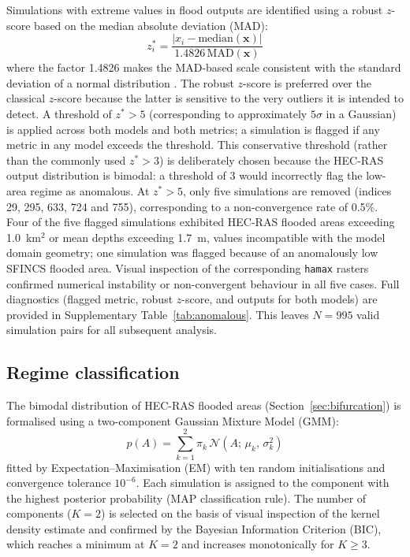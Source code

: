\documentclass[review,12pt]{elsarticle}
\newcommand{\hecras}{\textsc{HEC-RAS}}
\begin{document}
Simulations with extreme values in flood outputs are identified using a
robust $z$-score based on the median absolute deviation (MAD):
\begin{equation}
  z_i^* = \frac{|x_i - \mathrm{median}(\mathbf{x})|}{1.4826\,\mathrm{MAD}(\mathbf{x})}
  \label{eq:robust_z}
\end{equation}
where the factor 1.4826 makes the MAD-based scale consistent with the
standard deviation of a normal distribution \citep{rousseeuw1993}.
The robust $z$-score is preferred over the classical $z$-score because the
latter is sensitive to the very outliers it is intended to detect.
A threshold of $z^* > 5$ (corresponding to approximately $5\sigma$ in a
Gaussian) is applied across both models and both metrics; a simulation is
flagged if any metric in any model exceeds the threshold.
This conservative threshold (rather than the commonly used $z^* > 3$) is
deliberately chosen because the \hecras{} output distribution is bimodal:
a threshold of 3 would incorrectly flag the low-area regime as anomalous.
At $z^* > 5$, only five simulations are removed (indices 29, 295, 633, 724
and 755), corresponding to a non-convergence rate of 0.5\%.
Four of the five flagged simulations exhibited \hecras{} flooded areas
exceeding 1.0~km$^2$ or mean depths exceeding 1.7~m, values incompatible
with the model domain geometry; one simulation was flagged because of an
anomalously low SFINCS flooded area.
Visual inspection of the corresponding \texttt{hamax} rasters confirmed
numerical instability or non-convergent behaviour in all five cases.
Full diagnostics (flagged metric, robust $z$-score, and outputs for both
models) are provided in Supplementary Table~\ref{tab:anomalous}.
This leaves $N = 995$ valid simulation pairs for all subsequent analysis.

\subsection{Regime classification}
\label{sec:gmm}

The bimodal distribution of \hecras{} flooded areas
(Section~\ref{sec:bifurcation}) is formalised using a two-component
Gaussian Mixture Model (GMM):
\begin{equation}
  p(A) = \sum_{k=1}^{2} \pi_k \,\mathcal{N}(A;\,\mu_k,\,\sigma_k^2)
\end{equation}
fitted by Expectation--Maximisation (EM) with ten random initialisations
and convergence tolerance $10^{-6}$.
Each simulation is assigned to the component with the highest posterior
probability (MAP classification rule).
The number of components ($K = 2$) is selected on the basis of visual
inspection of the kernel density estimate and confirmed by the Bayesian
Information Criterion (BIC), which reaches a minimum at $K = 2$ and
increases monotonically for $K \geq 3$.
\end{document}

